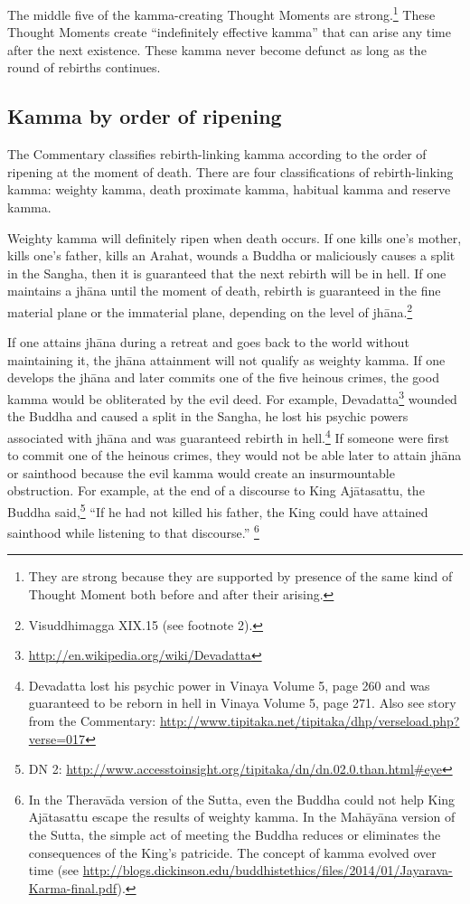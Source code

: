The middle five of the kamma-creating Thought Moments are strong.\footnote{They are strong because they are supported by presence of the same kind of Thought Moment both before and after their arising.} These Thought Moments create “indefinitely effective kamma” that can arise any time after the next existence. These kamma never become defunct as long as the round of rebirths continues.

\subsection*{Kamma by order of ripening}

The Commentary classifies rebirth-linking kamma according to the order of ripening at the moment of death. There are four classifications of rebirth-linking kamma: weighty kamma, death proximate kamma, habitual kamma and reserve kamma.

Weighty kamma will definitely ripen when death occurs. If one kills one’s mother, kills one’s father, kills an Arahat, wounds a Buddha or maliciously causes a split in the Sangha, then it is guaranteed that the next rebirth will be in hell. If one maintains a jhāna until the moment of death, rebirth is guaranteed in the fine material plane or the immaterial plane, depending on the level of jhāna.\footnote{Visuddhimagga XIX.15 (see footnote 2).} 

If one attains jhāna during a retreat and goes back to the world without maintaining it, the jhāna attainment will not qualify as weighty kamma. If one develops the jhāna and later commits one of the five heinous crimes, the good kamma would be obliterated by the evil deed. For example, Devadatta\footnote{\url{http://en.wikipedia.org/wiki/Devadatta}} wounded the Buddha and caused a split in the Sangha, he lost his psychic powers associated with jhāna and was guaranteed rebirth in hell.\footnote{Devadatta lost his psychic power in Vinaya Volume 5, page 260 and was guaranteed to be reborn in hell in Vinaya Volume 5, page 271. Also see story from the Commentary: \url{http://www.tipitaka.net/tipitaka/dhp/verseload.php?verse=017}} If someone were first to commit one of the heinous crimes, they would not be able later to attain jhāna or sainthood because the evil kamma would create an insurmountable obstruction. For example, at the end of a discourse to King Ajātasattu, the Buddha said,\footnote{DN 2: \url{http://www.accesstoinsight.org/tipitaka/dn/dn.02.0.than.html\#eye}} “If he had not killed his father, the King could have attained sainthood while listening to that discourse.” \footnote{In the Theravāda version of the Sutta, even the Buddha could not help King Ajātasattu escape the results of weighty kamma. In the Mahāyāna version of the Sutta, the simple act of meeting the Buddha reduces or eliminates the consequences of the King’s patricide. The concept of kamma evolved over time (see \url{http://blogs.dickinson.edu/buddhistethics/files/2014/01/Jayarava-Karma-final.pdf}).}


